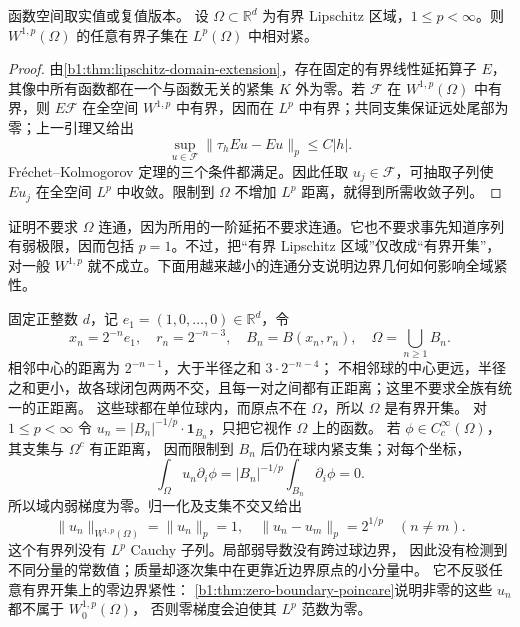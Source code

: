 \begin{proposition}\label{b1:prop:rellich-base-lp}
函数空间取实值或复值版本。
设 \(\Omega\subset\mathbb R^d\) 为有界 Lipschitz 区域，\(1\le p<\infty\)。则 \(W^{1,p}(\Omega)\) 的任意有界子集在 \(L^p(\Omega)\) 中相对紧。
\end{proposition}
\begin{proof}
由\cref{b1:thm:lipschitz-domain-extension}，存在固定的有界线性延拓算子 \(E\)，其像中所有函数都在一个与函数无关的紧集 \(K\) 外为零。若 \(\mathcal F\) 在 \(W^{1,p}(\Omega)\) 中有界，则 \(E\mathcal F\) 在全空间 \(W^{1,p}\) 中有界，因而在 \(L^p\) 中有界；共同支集保证远处尾部为零；上一引理又给出
\[
 \sup_{u\in\mathcal F}\|\tau_hEu-Eu\|_p\le C|h|.
\]
Fréchet–Kolmogorov 定理的三个条件都满足。因此任取 \(u_j\in\mathcal F\)，可抽取子列使 \(Eu_j\) 在全空间 \(L^p\) 中收敛。限制到 \(\Omega\) 不增加 \(L^p\) 距离，就得到所需收敛子列。
\end{proof}

证明不要求 \(\Omega\) 连通，因为所用的一阶延拓不要求连通。它也不要求事先知道序列有弱极限，因而包括 \(p=1\)。不过，把“有界 Lipschitz 区域”仅改成“有界开集”，对一般 \(W^{1,p}\) 就不成立。下面用越来越小的连通分支说明边界几何如何影响全域紧性。

\begin{proposition}[无限分量中的质量逃向边界]\label{b1:eg:infinitely-many-components}
固定正整数 \(d\)，记 \(e_1=(1,0,\ldots,0)\in\mathbb R^d\)，令
\[
 x_n=2^{-n}e_1,\quad r_n=2^{-n-3},\quad B_n=B(x_n,r_n),\quad
 \Omega=\bigcup_{n\ge1}B_n.
\]
相邻中心的距离为 \(2^{-n-1}\)，大于半径之和 \(3\cdot2^{-n-4}\)；
不相邻球的中心更远，半径之和更小，故各球闭包两两不交，且每一对之间都有正距离；这里不要求全族有统一的正距离。
这些球都在单位球内，而原点不在 \(\Omega\)，所以 \(\Omega\) 是有界开集。
对 \(1\le p<\infty\) 令 \(u_n=|B_n|^{-1/p}\cdot\mathbf1_{B_n}\)，只把它视作 \(\Omega\) 上的函数。
若 \(\phi\in C_c^\infty(\Omega)\)，其支集与 \(\Omega^c\) 有正距离，
因而限制到 \(B_n\) 后仍在球内紧支集；对每个坐标，
\[
 \int_\Omega u_n\partial_i\phi=|B_n|^{-1/p}\int_{B_n}\partial_i\phi=0.
\]
所以域内弱梯度为零。归一化及支集不交又给出
\[
 \|u_n\|_{W^{1,p}(\Omega)}=\|u_n\|_p=1,\quad
 \|u_n-u_m\|_p=2^{1/p}\quad(n\ne m).
\]
这个有界列没有 \(L^p\) Cauchy 子列。局部弱导数没有跨过球边界，
因此没有检测到不同分量的常数值；质量却逐次集中在更靠近边界原点的小分量中。
它不反驳任意有界开集上的零边界紧性：
\cref{b1:thm:zero-boundary-poincare}说明非零的这些 \(u_n\) 都不属于 \(W_0^{1,p}(\Omega)\)，
否则零梯度会迫使其 \(L^p\) 范数为零。
\end{proposition}

